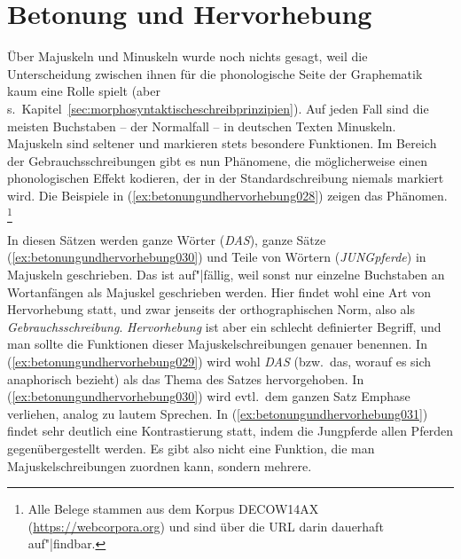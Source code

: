 \section{Betonung und Hervorhebung}
\label{sec:betonungundhervorhebung}


Über Majuskeln und Minuskeln wurde noch nichts gesagt, weil die Unterscheidung zwischen ihnen für die phonologische Seite der Graphematik kaum eine Rolle spielt (aber s.\ Kapitel~\ref{sec:morphosyntaktischeschreibprinzipien}).
Auf jeden Fall sind die meisten Buchstaben -- der Normalfall -- in deutschen Texten Minuskeln.
Majuskeln sind seltener und markieren stets besondere Funktionen.
Im Bereich der Gebrauchsschreibungen gibt es nun Phänomene, die möglicherweise einen phonologischen Effekt kodieren, der in der Standardschreibung niemals markiert wird.
Die Beispiele in (\ref{ex:betonungundhervorhebung028}) zeigen das Phänomen.%
\footnote{Alle Belege stammen aus dem Korpus DECOW14AX (\url{https://webcorpora.org}) und sind über die URL darin dauerhaft auf"|findbar.}

\begin{exe}
  \ex\label{ex:betonungundhervorhebung028}
  \begin{xlist}
  \end{xlist}
\end{exe}

In diesen Sätzen werden ganze Wörter (\textit{DAS}), ganze Sätze (\ref{ex:betonungundhervorhebung030}) und Teile von Wörtern (\textit{JUNGpferde}) in Majuskeln geschrieben.
Das ist auf"|fällig, weil sonst nur einzelne Buchstaben an Wortanfängen als Majuskel geschrieben werden.
Hier findet wohl eine Art von Hervorhebung statt, und zwar jenseits der orthographischen Norm, also als \textit{Gebrauchsschreibung}.
\textit{Hervorhebung} ist aber ein schlecht definierter Begriff, und man sollte die Funktionen dieser Majuskelschreibungen genauer benennen.
In (\ref{ex:betonungundhervorhebung029}) wird wohl \textit{DAS} (bzw.\ das, worauf es sich anaphorisch bezieht) als das Thema des Satzes hervorgehoben.
In (\ref{ex:betonungundhervorhebung030}) wird evtl.\ dem ganzen Satz Emphase verliehen, analog zu lautem Sprechen.
In (\ref{ex:betonungundhervorhebung031}) findet sehr deutlich eine Kontrastierung statt, indem die Jungpferde allen Pferden gegenübergestellt werden.
Es gibt also nicht eine Funktion, die man Majuskelschreibungen zuordnen kann, sondern mehrere.

